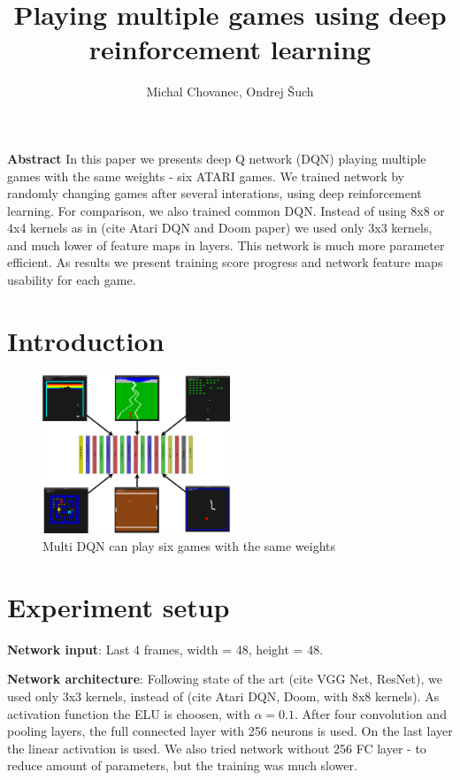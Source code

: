 \documentclass[10pt,a4paper]{article}
\begin{document}
\title{Playing multiple games using deep reinforcement learning}
\author{Michal Chovanec, Ondrej Šuch}
\date{}
\maketitle
\thispagestyle{empty}

{\bf Abstract}
In this paper we presents deep Q network (DQN) playing multiple games with the same weights - six ATARI games.
We trained network by randomly changing games after several interations, using deep reinforcement learning.
For comparison, we also trained common DQN. Instead of using 8x8 or 4x4 kernels as in (cite Atari DQN and Doom paper)
we used only 3x3 kernels, and much lower of feature maps in layers. This network is much more parameter efficient.
As results we present training score progress and network feature maps usability for each game.


\section{Introduction}


\begin{figure}[htb!]
\centering
\includegraphics[width=0.5\textwidth]{diagrams/multi_dqn.png}
\caption{Multi DQN can play six games with the same weights}

\end{figure}

\section{Experiment setup}

{\bf Network input}:
Last 4 frames, width = 48, height = 48.


{\bf Network architecture}:
Following state of the art (cite VGG Net, ResNet), we used only 3x3 kernels, instead of (cite Atari DQN, Doom, with 8x8 kernels). As activation
function the ELU is choosen, with $\alpha = 0.1$.
After four convolution and pooling layers, the full connected layer with 256 neurons is used.
On the last layer the linear activation is used. We also tried network without 256 FC layer - to reduce amount of parameters, but the training was much slower.
\end{document}
